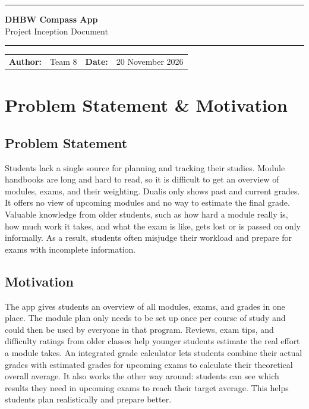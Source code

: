 \documentclass[11pt, a4paper]{article}
\begin{document}
	
	{\color{primary}\rule{\linewidth}{2pt}}\vspace{0.6em}
	{\LARGE\bfseries\color{textdark} DHBW Compass App}\\[0.3em]
	{\large\color{muted} Project Inception Document} \\
	\vspace{0.3em}
	{\color{primary}\rule{\linewidth}{0.8pt}}
	
	\vspace{0.8em}
	
	\begin{tabularx}{\linewidth}{@{} l X r X @{}}
		\textbf{Author:} & Team 8 & \textbf{Date:} & 20 November 2026 \\
	\end{tabularx}
	
	\vspace{1em}
	
	\section{Problem Statement \& Motivation}
	
	\subsection{Problem Statement}
	Students lack a single source for planning and tracking their studies.
	Module handbooks are long and hard to read, so it is difficult to get an overview of modules, exams, and their weighting. Dualis only shows past and current grades. It offers no view of upcoming modules and no way to estimate the final grade. Valuable knowledge from older students, such as how hard a module really is, how much work it takes, and what the exam is like, gets lost or is passed on only informally. As a result, students often misjudge their workload and prepare for exams with incomplete information.
	
	\subsection{Motivation}
	The app gives students an overview of all modules, exams, and grades in one place. The module plan only needs to be set up once per course of study and could then be used by everyone in that program. Reviews, exam tips, and difficulty ratings from older classes help younger students estimate the real effort a module takes. An integrated grade calculator lets students combine their actual grades with estimated grades for upcoming exams to calculate their theoretical overall average. It also works the other way around: students can see which results they need in upcoming exams to reach their target average. This helps students plan realistically and prepare better.
	
\end{document}
